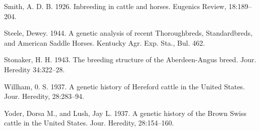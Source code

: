 \begin{hangparas}{0.5in}{1}
Smith, A. D. B. 1926. Inbreeding in cattle and horses. Eugenics Review, 18:189--204.

Steele, Dewey. 1944. A genetic analysis of recent Thoroughbreds, Standardbreds, and
American Saddle Horses. Kentucky Agr. Exp. Sta., Bul. 462.

Stonaker, H. H. 1943. The breeding structure of the Aberdeen-Angus breed. Jour.
Heredity 34:322--28.

Willham, 0. S. 1937. A genetic history of Hereford cattle in the United States.
Jour. Heredity, 28:283--94.

Yoder, Dorsa M., and Lush, Jay L. 1937. A genetic history of the Brown Swiss cattle
in the United States. Jour. Heredity, 28:154--160.
\end{hangparas}
